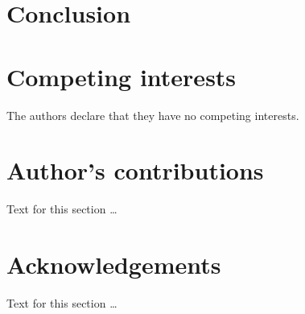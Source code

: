 \documentclass{bmcart}
\begin{document}


\section*{Conclusion}



\begin{backmatter}

\section*{Competing interests}
  The authors declare that they have no competing interests.

\section*{Author's contributions}
    Text for this section \ldots

\section*{Acknowledgements}
  Text for this section \ldots


\end{backmatter}
\end{document}
